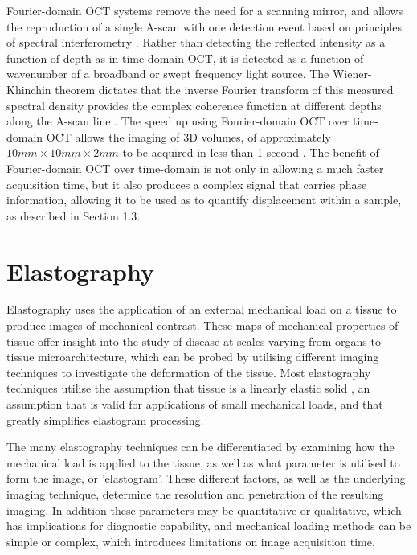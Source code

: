 Fourier-domain OCT systems remove the need for a scanning mirror, and allows the reproduction of a single A-scan with one detection event based on principles of spectral interferometry \cite{chin_parametric_2016}. Rather than detecting the reflected intensity as a function of depth as in time-domain OCT, it is detected as a function of wavenumber of a broadband or swept frequency light source. The Wiener-Khinchin theorem dictates that the inverse Fourier transform of this measured spectral density provides the complex coherence function at different depths along the A-scan line \cite{schmitt_optical_1999}. The speed up using Fourier-domain OCT over time-domain OCT allows the imaging of 3D volumes, of approximately $10mm \times 10mm \times 2mm$ to be acquired in less than 1 second \cite{kennedy_emergence_2017}. The benefit of Fourier-domain OCT over time-domain is not only in allowing a much faster acquisition time, but it also produces a complex signal that carries phase information, allowing it to be used as to quantify displacement within a sample, as described in Section 1.3.

\section{Elastography}
Elastography uses the application of an external mechanical load on a tissue to produce images of mechanical contrast. These maps of mechanical properties of tissue offer insight into the study of disease at scales varying from organs to tissue microarchitecture, which can be probed by utilising different imaging techniques to investigate the deformation of the tissue. Most elastography techniques utilise the assumption that tissue is a linearly elastic solid \cite{kennedy_review_2014}, an assumption that is valid for applications of small mechanical loads, and that greatly simplifies elastogram processing. 

The many elastography techniques can be differentiated by examining how the mechanical load is applied to the tissue, as well as what parameter is utilised to form the image, or 'elastogram'. These different factors, as well as the underlying imaging technique, determine the resolution and penetration of the resulting imaging. In addition these parameters may be quantitative or qualitative, which has implications for diagnostic capability, and mechanical loading methods can be simple or complex, which introduces limitations on image acquisition time.

